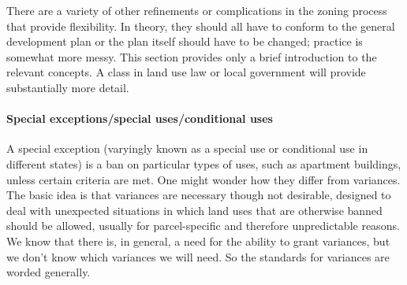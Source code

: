 There are a variety of other refinements or complications in the zoning process
that provide flexibility. In theory, they should all have to conform to the
general development plan or the plan itself should have to be changed; practice
is somewhat more messy. This section provides only a brief introduction to the
relevant concepts. A class in land use law or local government will provide
substantially more detail.

\paragraph{Special exceptions/special uses/conditional uses}
A special exception (varyingly known as a special use or conditional use in
different states) is a ban on particular types of uses, such as apartment
buildings, unless certain criteria are met. One might wonder how they differ
from variances. The basic idea is that variances are necessary though not
desirable, designed to deal with unexpected situations in which land uses that
are otherwise banned should be allowed, usually for parcel-specific and
therefore unpredictable reasons. We know that there is, in general, a need for
the ability to grant variances, but we don't know which variances we will need.
So the standards for variances are worded generally. 

